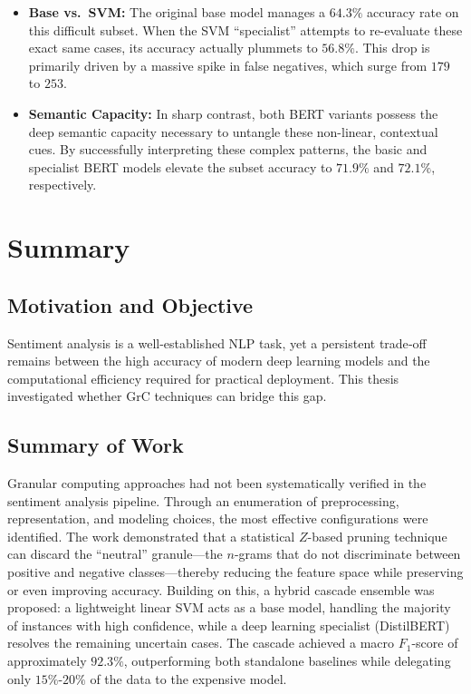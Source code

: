 \documentclass[a4paper,twoside,12pt]{book}
\newcommand{\zscore}{Z}
\begin{document}
\begin{itemize}
	\item \textbf{Base vs.\ SVM:} The original base model manages a $64.3\%$ accuracy rate on this difficult subset. When the SVM ``specialist'' attempts to re-evaluate these exact same cases, its accuracy actually plummets to $56.8\%$. This drop is primarily driven by a massive spike in false negatives, which surge from $179$ to $253$.
	
	\item \textbf{Semantic Capacity:} In sharp contrast, both BERT variants possess the deep semantic capacity necessary to untangle these non-linear, contextual cues. By successfully interpreting these complex patterns, the basic and specialist BERT models elevate the subset accuracy to $71.9\%$ and $72.1\%$, respectively.
\end{itemize}

\chapter{Summary} \label{chap:summary}

\section{Motivation and Objective}

Sentiment analysis is a well-established NLP task, yet a persistent trade‑off remains between the high accuracy of modern deep learning models and the computational efficiency required for practical deployment. This thesis investigated whether GrC techniques can bridge this gap.

\section{Summary of Work}

Granular computing approaches had not been systematically verified in the sentiment analysis pipeline. Through an enumeration of preprocessing, representation, and modeling choices, the most effective configurations were identified. The work demonstrated that a statistical $\zscore$-based pruning technique can discard the ``neutral'' granule---the $n$-grams that do not discriminate between positive and negative classes---thereby reducing the feature space while preserving or even improving accuracy. Building on this, a hybrid cascade ensemble was proposed: a lightweight linear SVM acts as a base model, handling the majority of instances with high confidence, while a deep learning specialist (DistilBERT) resolves the remaining uncertain cases. The cascade achieved a macro $F_1$-score of approximately $92.3\%$, outperforming both standalone baselines while delegating only $15\%$-$20\%$ of the data to the expensive model.
\end{document}

